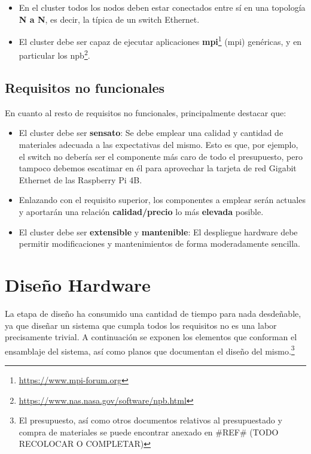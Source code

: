 \begin{itemize}
    \item En el cluster todos los nodos deben estar conectados entre sí en una topología \textbf{N a N}, es decir, la típica de un switch Ethernet.
    \item El cluster debe ser capaz de ejecutar aplicaciones \textbf{\acrshort{mpi}}\footnote{\url{https://www.mpi-forum.org}} (\acrlong{mpi}) genéricas, y en particular los \acrlong{npb}\footnote{\url{https://www.nas.nasa.gov/software/npb.html}}.
\end{itemize}

\subsection{Requisitos no funcionales}
En cuanto al resto de requisitos no funcionales, principalmente destacar que:
\begin{itemize}
    \item El cluster debe ser \textbf{sensato}: Se debe emplear una calidad y cantidad de materiales adecuada a las expectativas del mismo. Esto es que, por ejemplo, el switch no debería ser el componente más caro de todo el presupuesto, pero tampoco debemos escatimar en él para aprovechar la tarjeta de red Gigabit Ethernet de las Raspberry Pi 4B.
    \item Enlazando con el requisito superior, los componentes a emplear serán actuales y aportarán una relación \textbf{calidad/precio} lo más \textbf{elevada} posible.
    \item El cluster debe ser \textbf{extensible} y \textbf{mantenible}: El despliegue hardware debe permitir modificaciones y mantenimientos de forma moderadamente sencilla.
\end{itemize}

\section{Diseño Hardware}
\label{sec:diseño_hardware}
La etapa de diseño ha consumido una cantidad de tiempo para nada desdeñable, ya que diseñar un sistema que cumpla todos los requisitos no es una labor precisamente trivial. A continuación se exponen los elementos que conforman el ensamblaje del sistema, así como planos que documentan el diseño del mismo.\footnote{El presupuesto, así como otros documentos relativos al presupuestado y compra de materiales se puede encontrar anexado en \#REF\# (TODO RECOLOCAR O COMPLETAR)}

